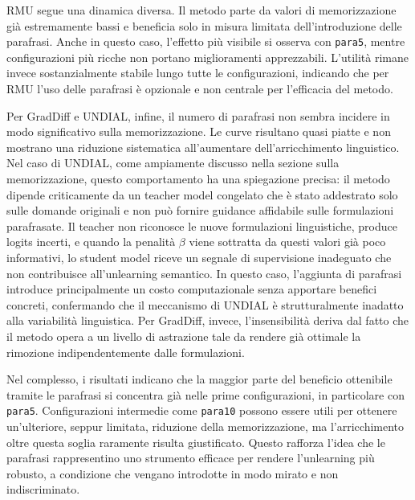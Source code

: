 RMU segue una dinamica diversa. Il metodo parte da valori di memorizzazione già estremamente bassi e beneficia solo in misura limitata dell’introduzione delle parafrasi. Anche in questo caso, l’effetto più visibile si osserva con \texttt{para5}, mentre configurazioni più ricche non portano miglioramenti apprezzabili. L’utilità rimane invece sostanzialmente stabile lungo tutte le configurazioni, indicando che per RMU l’uso delle parafrasi è opzionale e non centrale per l’efficacia del metodo.

Per GradDiff e UNDIAL, infine, il numero di parafrasi non sembra incidere in modo significativo sulla memorizzazione. Le curve risultano quasi piatte e non mostrano una riduzione sistematica all'aumentare dell'arricchimento linguistico. Nel caso di UNDIAL, come ampiamente discusso nella sezione sulla memorizzazione, questo comportamento ha una spiegazione precisa: il metodo dipende criticamente da un teacher model congelato che è stato addestrato solo sulle domande originali e non può fornire guidance affidabile sulle formulazioni parafrasate. Il teacher non riconosce le nuove formulazioni linguistiche, produce logits incerti, e quando la penalità $\beta$ viene sottratta da questi valori già poco informativi, lo student model riceve un segnale di supervisione inadeguato che non contribuisce all'unlearning semantico. In questo caso, l'aggiunta di parafrasi introduce principalmente un costo computazionale senza apportare benefici concreti, confermando che il meccanismo di UNDIAL è strutturalmente inadatto alla variabilità linguistica. Per GradDiff, invece, l'insensibilità deriva dal fatto che il metodo opera a un livello di astrazione tale da rendere già ottimale la rimozione indipendentemente dalle formulazioni.

Nel complesso, i risultati indicano che la maggior parte del beneficio ottenibile tramite le parafrasi si concentra già nelle prime configurazioni, in particolare con \texttt{para5}. Configurazioni intermedie come \texttt{para10} possono essere utili per ottenere un’ulteriore, seppur limitata, riduzione della memorizzazione, ma l’arricchimento oltre questa soglia raramente risulta giustificato. Questo rafforza l’idea che le parafrasi rappresentino uno strumento efficace per rendere l’unlearning più robusto, a condizione che vengano introdotte in modo mirato e non indiscriminato.